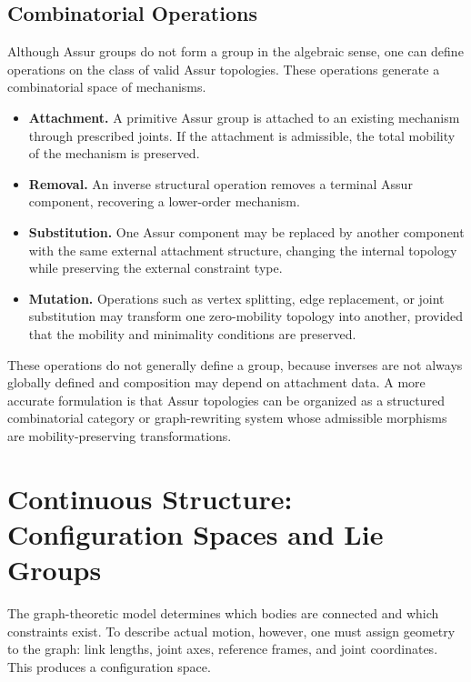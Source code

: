 \subsection{Combinatorial Operations}

Although Assur groups do not form a group in the algebraic sense, one can define operations on the class of valid Assur topologies. These operations generate a combinatorial space of mechanisms.

\begin{itemize}
\item \textbf{Attachment.} A primitive Assur group is attached to an existing mechanism through prescribed joints. If the attachment is admissible, the total mobility of the mechanism is preserved.

\item \textbf{Removal.} An inverse structural operation removes a terminal Assur component, recovering a lower-order mechanism.

\item \textbf{Substitution.} One Assur component may be replaced by another component with the same external attachment structure, changing the internal topology while preserving the external constraint type.

\item \textbf{Mutation.} Operations such as vertex splitting, edge replacement, or joint substitution may transform one zero-mobility topology into another, provided that the mobility and minimality conditions are preserved.

\end{itemize}

These operations do not generally define a group, because inverses are not always globally defined and composition may depend on attachment data. A more accurate formulation is that Assur topologies can be organized as a structured combinatorial category or graph-rewriting system whose admissible morphisms are mobility-preserving transformations.

\section{Continuous Structure: Configuration Spaces and Lie Groups}

The graph-theoretic model determines which bodies are connected and which constraints exist. To describe actual motion, however, one must assign geometry to the graph: link lengths, joint axes, reference frames, and joint coordinates. This produces a configuration space.

